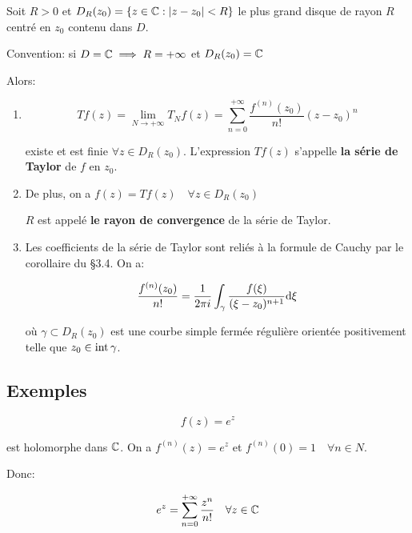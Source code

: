 \begin{result}
    Soit $R > 0$ et $D_R(z_0) = \{z \in \mathbb{C} : \left|z - z_0\right| < R \}$ le plus grand disque de rayon $R$ centré en $z_0$ contenu dans $D$.
    
    Convention: si $D = \mathbb{C} \implies R = +\infty$ et $D_R(z_0) = \mathbb{C}$
    
    Alors:
    
    \begin{enumerate}[label=\arabic{enumi})]
        \item 
        \[
        T f(z) = \lim_{N \rightarrow +\infty} T_N f(z) = \sum_{n = 0}^{+\infty} \frac{f^{(n)}(z_0)}{n!}(z - z_0)^n
        \]
        
        existe et est finie $\forall z \in D_R(z_0)$. L'expression $T f(z)$ s'appelle \textbf{la série de Taylor} de $f$ en $z_0$.
        
        \item 
        De plus, on a $f(z) = T f(z) \quad \forall z \in D_R(z_0)$
        
        $R$ est appelé \textbf{le rayon de convergence} de la série de Taylor.
        
        \item 
        Les coefficients de la série de Taylor sont reliés à la formule de Cauchy par le corollaire du §3.4.
        On a:
        
        \[ \frac{f^{(n)}(z_0)}{n!} = \frac{1}{2\pi i} \int_\gamma \frac{f(\xi)}{(\xi - z_0)^{n+1}} \mathrm{d}\xi \]
        
        où $\gamma \subset D_R(z_0)$ est une courbe simple fermée régulière orientée positivement telle que $z_0 \in \textrm{int}\, \gamma$.
    \end{enumerate}
\end{result}

\subsection{Exemples}

\begin{example}[1]
    \[f(z) = e^z\]
    
    est holomorphe dans $\mathbb{C}$.
    On a $f^{(n)}(z) = e^z$ et $f^{(n)}(0) = 1 \quad \forall n \in N$.
    
    Donc:
    
    \[ e^z = \sum_{n=0}^{+\infty} \frac{z^n}{n!} \quad \forall z \in \mathbb{C} \]
\end{example}


